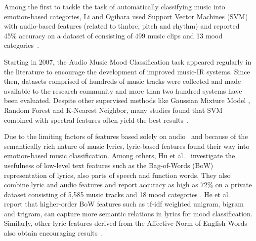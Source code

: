 \documentclass{llncs}
\begin{document}
Among the first to tackle the task of automatically classifying music into emotion-based categories, Li and Ogihara used Support Vector Machines (SVM) with audio-based features (related to timbre, pitch and rhythm) and reported 45\% accuracy on a dataset of consisting of 499 music clips and 13 mood categories~\cite{DBLP:conf/ismir/LiM03}.



Starting in 2007, the Audio Music Mood Classification task appeared regularly in the literature to encourage the development of improved music-IR systems. Since then, datasets comprised of hundreds of music tracks were collected and made available to the research community and more than two hundred systems have been evaluated. Despite other supervised methods like Gaussian Mixture Model \cite{DBLP:journals/taslp/LuLZ06}, Random Forest and K-Nearest Neighbor, many studies found that SVM combined with spectral features often yield the best results~\cite{Yang2012Machine}.


Due to the limiting factors of features based solely on audio~\cite{DBLP:journals/taslp/LuLZ06} and because of the semantically rich nature of music lyrics, lyric-based features found their way into emotion-based music classification. Among others, Hu et al.~\cite{DBLP:conf/ismir/HuDE09} investigate the usefulness of low-level text features such as the Bag-of-Words (BoW) representation of lyrics, also parts of speech and function words. They also combine lyric and audio features and report accuracy as high as 72\% on a private dataset consisting of 5,585 music tracks and 18 mood categories \cite{DBLP:conf/ismir/HuDLBE08}. He et al.~\cite{DBLP:conf/isica/HeJXCSZ08} report that higher-order BoW features such as tf-idf weighted unigram, bigram and trigram, can capture more semantic relations in lyrics for mood classification. Similarly, other lyric features derived from the Affective Norm of English Words also obtain encouraging results~\cite{DBLP:conf/ismir/HuCY09}. 
\end{document}
